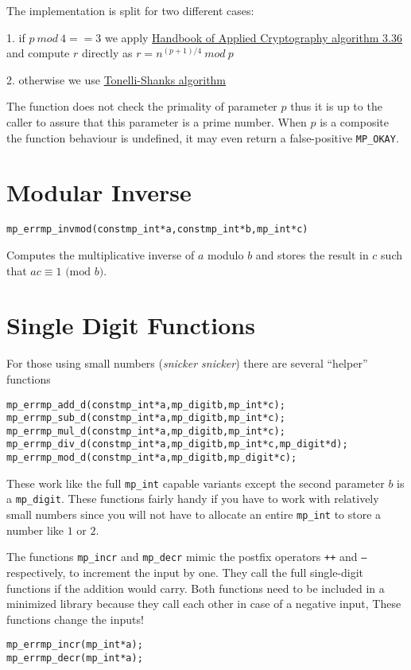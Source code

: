 \documentclass[synpaper]{book}
\def\mod{{\mathit\ mod\ }}
\begin{document}
The implementation is split for two different cases:

1. if $p \mod 4 == 3$ we apply \href{http://cacr.uwaterloo.ca/hac/}{Handbook of Applied Cryptography algorithm 3.36} and compute $r$ directly as
$r = n^{(p+1)/4} \mod p$

2. otherwise we use \href{https://en.wikipedia.org/wiki/Tonelli-Shanks_algorithm}{Tonelli-Shanks algorithm}

The function does not check the primality of parameter $p$ thus it is up to the caller to assure that this parameter
is a prime number. When $p$ is a composite the function behaviour is undefined, it may even return a false-positive
\texttt{MP\_OKAY}.

\section{Modular Inverse}
\begin{alltt}
mp_err mp_invmod (const mp_int *a, const mp_int *b, mp_int *c)
\end{alltt}
Computes the multiplicative inverse of $a$ modulo $b$ and stores the result in $c$ such that $ac \equiv 1 \mbox{ (mod }b\mbox{)}$.

\section{Single Digit Functions}

For those using small numbers (\textit{snicker snicker}) there are several ``helper'' functions

    
\begin{alltt}
mp_err mp_add_d(const mp_int *a, mp_digit b, mp_int *c);
mp_err mp_sub_d(const mp_int *a, mp_digit b, mp_int *c);
mp_err mp_mul_d(const mp_int *a, mp_digit b, mp_int *c);
mp_err mp_div_d(const mp_int *a, mp_digit b, mp_int *c, mp_digit *d);
mp_err mp_mod_d(const mp_int *a, mp_digit b, mp_digit *c);
\end{alltt}

These work like the full \texttt{mp\_int} capable variants except the second parameter $b$ is a \texttt{mp\_digit}.  These
functions fairly handy if you have to work with relatively small numbers since you will not have to allocate
an entire \texttt{mp\_int} to store a number like $1$ or $2$.

The functions \texttt{mp\_incr} and \texttt{mp\_decr} mimic the postfix operators \texttt{++} and \texttt{--} respectively, to increment the input by one. They call the full single-digit functions if the addition would carry. Both functions need to be included in a minimized library because they call each other in case of a negative input, These functions change the inputs!
\begin{alltt}
mp_err mp_incr(mp_int *a);
mp_err mp_decr(mp_int *a);
\end{alltt}
\end{document}
